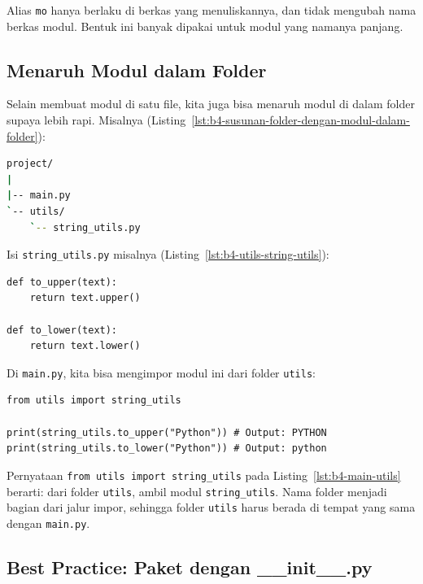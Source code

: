 Alias \texttt{mo} hanya berlaku di berkas yang menuliskannya, dan tidak mengubah nama berkas modul. Bentuk ini banyak dipakai untuk modul yang namanya panjang.

\subsection{Menaruh Modul dalam Folder}

Selain membuat modul di satu file, kita juga bisa menaruh modul di dalam folder supaya lebih rapi. Misalnya (Listing~\ref{lst:b4-susunan-folder-dengan-modul-dalam-folder}):

\begin{lstlisting}[language=bash, caption={Susunan folder dengan modul di dalam folder utils}, label={lst:b4-susunan-folder-dengan-modul-dalam-folder}]
project/
|
|-- main.py
`-- utils/
    `-- string_utils.py
\end{lstlisting}

Isi \texttt{string_utils.py} misalnya (Listing~\ref{lst:b4-utils-string-utils}):

\begin{lstlisting}[style=PythonStyle, caption={Kode Python: utils/string_utils.py}, label={lst:b4-utils-string-utils}]
def to_upper(text):
    return text.upper()

def to_lower(text):
    return text.lower()
\end{lstlisting}

Di \texttt{main.py}, kita bisa mengimpor modul ini dari folder \texttt{utils}:

\begin{lstlisting}[style=PythonStyle, caption={Kode Python: main.py}, label={lst:b4-main-utils}]
from utils import string_utils

print(string_utils.to_upper("Python")) # Output: PYTHON
print(string_utils.to_lower("Python")) # Output: python
\end{lstlisting}

Pernyataan \texttt{from utils import string_utils} pada Listing~\ref{lst:b4-main-utils} berarti: dari folder \texttt{utils}, ambil modul \texttt{string_utils}. Nama folder menjadi bagian dari jalur impor, sehingga folder \texttt{utils} harus berada di tempat yang sama dengan \texttt{main.py}.

\subsection{Best Practice: Paket dengan __init__.py}


